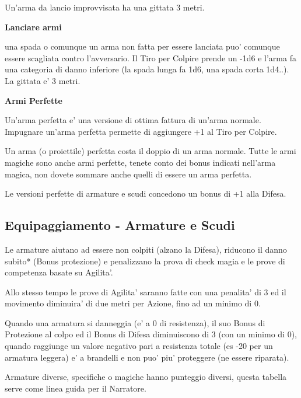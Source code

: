\documentclass[a4paper,11pt,twoside,openany]{book}
\begin{document}
{Un'arma da lancio improvvisata ha una gittata 3 metri.

\medskip

\textbf{Lanciare armi}
	
una spada o comunque un arma non fatta per essere lanciata puo' comunque essere scagliata contro l'avversario. Il Tiro per Colpire prende un -1d6 e l'arma fa una categoria di danno inferiore (la spada lunga fa 1d6, una spada corta 1d4..). La gittata e' 3 metri.

\medskip

\textbf{Armi Perfette}
	
Un'arma perfetta e' una versione di ottima fattura di un'arma normale.
Impugnare un'arma perfetta permette di aggiungere +1 al Tiro per Colpire.
	
Un arma (o proiettile) perfetta costa il doppio di un arma normale. 
Tutte le armi magiche sono anche armi perfette, tenete conto dei bonus 	indicati nell'arma magica, non dovete sommare anche quelli di essere un arma perfetta.
		
Le versioni perfette di armature e scudi concedono un bonus di +1 alla Difesa.



\pagebreak

\subsection{Equipaggiamento - Armature e Scudi}

\label{equipaggiamento---armature-e-scudi}

Le armature aiutano ad essere non colpiti (alzano la Difesa), riducono il danno subito{*} (Bonus protezione) e penalizzano la prova di check magia e le prove di competenza basate su Agilita'.

Allo stesso tempo le prove di Agilita' saranno fatte con una penalita' di 3 ed il movimento diminuira' di due metri per Azione, fino ad un minimo di 0.

Quando una armatura si danneggia (e' a 0 di resistenza), il suo Bonus di Protezione al colpo ed il Bonus di Difesa diminuiscono di 3 (con un minimo di 0), quando raggiunge un valore negativo pari a resistenza totale (es -20 per un armatura leggera) e' a brandelli e non puo' piu' proteggere (ne essere riparata).

Armature diverse, specifiche o magiche hanno punteggio diversi, questa tabella serve come linea guida per il Narratore.

}
\end{document}
